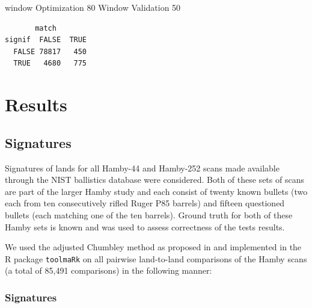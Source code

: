 \documentclass[12pt]{article}
\begin{document}
window Optimization 80 Window Validation 50

\begin{verbatim}
       match
signif  FALSE  TRUE
  FALSE 78817   450
  TRUE   4680   775
\end{verbatim}

\section{Results}\label{results}

\subsection{Signatures}\label{signatures}

Signatures of lands for all Hamby-44 and Hamby-252 scans made available
through the NIST ballistics database \citep{nist} were considered. Both
of these sets of scans are part of the larger Hamby study \citep{hamby}
and each consist of twenty known bullets (two each from ten
consecutively rifled Ruger P85 barrels) and fifteen questioned bullets
(each matching one of the ten barrels). Ground truth for both of these
Hamby sets is known and was used to assess correctness of the tests
results.

We used the adjusted Chumbley method as proposed in \citet{hadler} and
implemented in the R package \texttt{toolmaRk} \citep{toolmark} on all
pairwise land-to-land comparisons of the Hamby scans (a total of 85,491
comparisons) in the following manner:

\begin{table}

\caption{\label{tab:unnamed-chunk-5}Overview of parameter settings used for optimization and validation windows for bullet land signatures.}
\centering
{}
\end{table}

\subsubsection{Signatures}\label{signatures-1}
\end{document}
